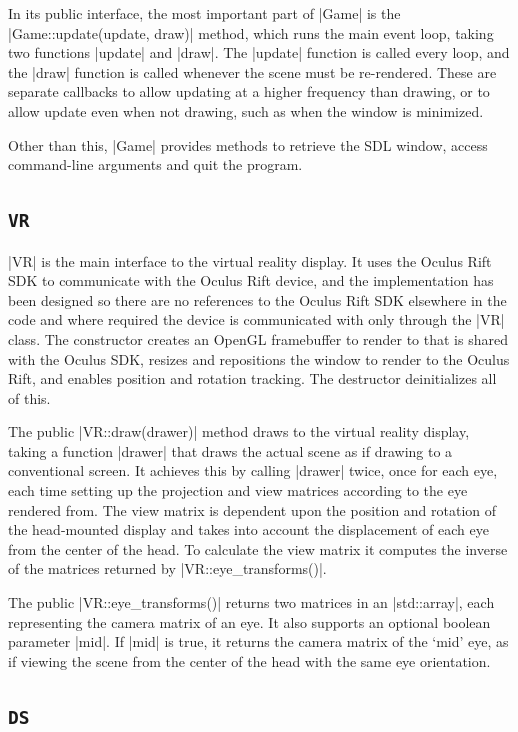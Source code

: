 \documentclass[pageno]{jpaper}
\begin{document}
In its public interface, the most important part of |Game| is the
|Game::update(update, draw)| method, which runs the main event loop, taking two
functions |update| and |draw|. The |update| function is called every loop, and
the |draw| function is called whenever the scene must be re-rendered. These are
separate callbacks to allow updating at a higher frequency than drawing, or to
allow update even when not drawing, such as when the window is minimized.

Other than this, |Game| provides methods to retrieve the SDL window, access
command-line arguments and quit the program.

\subsection{\lstinline|VR|}

|VR| is the main interface to the virtual reality display. It uses the Oculus
Rift SDK to communicate with the Oculus Rift device, and the implementation has
been designed so there are no references to the Oculus Rift SDK elsewhere in the
code and where required the device is communicated with only through the |VR|
class. The constructor creates an OpenGL framebuffer to render to that is shared
with the Oculus SDK, resizes and repositions the window to render to the Oculus
Rift, and enables position and rotation tracking. The destructor deinitializes
all of this.

The public |VR::draw(drawer)| method draws to the virtual reality display,
taking a function |drawer| that draws the actual scene as if drawing to a
conventional screen. It achieves this by calling |drawer| twice, once for each
eye, each time setting up the projection and view matrices according to the eye
rendered from. The view matrix is dependent upon the position and rotation of
the head-mounted display and takes into account the displacement of each eye
from the center of the head. To calculate the view matrix it computes the
inverse of the matrices returned by |VR::eye_transforms()|.

The public |VR::eye_transforms()| returns two matrices in an |std::array|, each
representing the camera matrix of an eye. It also supports an optional boolean
parameter |mid|. If |mid| is true, it returns the camera matrix of the `mid' eye,
as if viewing the scene from the center of the head with the same eye
orientation.

\subsection{\lstinline|DS|}
\end{document}

